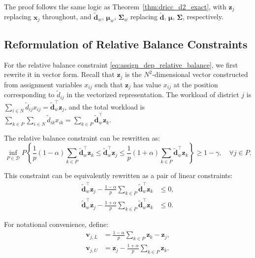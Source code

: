 \documentclass[preprint,12pt,authoryear]{elsarticle}
\begin{document}
The proof follows the same logic as Theorem~\ref{thm:dricc_d2_exact}, with $\mathbf{z}_j$ replacing $\mathbf{x}_j$ throughout, and $\widetilde{\mathbf{d}}_w$, $\boldsymbol{\mu}_w$, $\boldsymbol{\Sigma}_w$ replacing $\widetilde{\mathbf{d}}$, $\boldsymbol{\mu}$, $\boldsymbol{\Sigma}$, respectively.

\subsection{Reformulation of Relative Balance Constraints}

For the relative balance constraint \eqref{eq:assign_dep_relative_balance}, we first rewrite it in vector form. Recall that $\mathbf{z}_j$ is the $N^2$-dimensional vector constructed from assignment variables $x_{ij}$ such that $\mathbf{z}_j$ has value $x_{ij}$ at the position corresponding to $\tilde{d}_{ij}$ in the vectorized representation. The workload of district $j$ is $\sum_{i \in N} \tilde{d}_{ij} x_{ij} = \widetilde{\mathbf{d}}_w^\top \mathbf{z}_j$, and the total workload is $\sum_{k \in P}\sum_{i \in N} \tilde{d}_{ik} x_{ik} = \sum_{k \in P} \widetilde{\mathbf{d}}_w^\top \mathbf{z}_k$.

The relative balance constraint can be rewritten as:
\begin{equation}
\inf_{P \in \mathcal{D}} P \left\{ \frac{1}{p}(1 - \alpha)\sum_{k \in P}\widetilde{\mathbf{d}}_w^\top \mathbf{z}_k \leqslant \widetilde{\mathbf{d}}_w^\top \mathbf{z}_j \leqslant \frac{1}{p}(1 + \alpha)\sum_{k \in P}\widetilde{\mathbf{d}}_w^\top \mathbf{z}_k \right\} \geqslant 1 - \gamma, \quad \forall j \in P.
\label{eq:assign_dep_rel_joint}
\end{equation}

This constraint can be equivalently rewritten as a pair of linear constraints:
\begin{align}
\widetilde{\mathbf{d}}_w^\top \mathbf{z}_j - \frac{1-\alpha}{p}\sum_{k \in P}\widetilde{\mathbf{d}}_w^\top \mathbf{z}_k &\leqslant 0, \label{eq:assign_dep_rel_lower_linear} \\
\widetilde{\mathbf{d}}_w^\top \mathbf{z}_j - \frac{1+\alpha}{p}\sum_{k \in P}\widetilde{\mathbf{d}}_w^\top \mathbf{z}_k &\leqslant 0. \label{eq:assign_dep_rel_upper_linear}
\end{align}

For notational convenience, define:
\begin{align}
\mathbf{v}_{j,L} &= \frac{1-\alpha}{p}\sum_{k \in P} \mathbf{z}_k - \mathbf{z}_j, \\
\mathbf{v}_{j,U} &= \mathbf{z}_j - \frac{1+\alpha}{p}\sum_{k \in P} \mathbf{z}_k.
\end{align}
\end{document}
